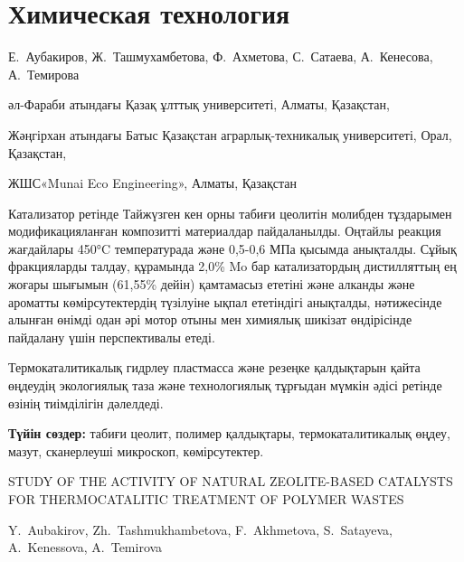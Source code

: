 \let\cleardoublepage\clearpage
\chapter{Химическая технология}

\begin{header}

Е.~Аубакиров,
Ж.~Ташмухамбетова,
Ф.~Ахметова\envelope,
С.~Сатаева,
А.~Кенесова,
А.~Темирова
\end{header}

\begin{affil}
әл-Фараби атындағы Қазақ ұлттық университеті, Алматы, Қазақстан,

Жәңгірхан атындағы Батыс Қазақстан аграрлық-техникалық университеті, Орал, Қазақстан,

 ЖШС«Munai Eco Engineering», Алматы, Қазақстан

\end{affil}

Катализатор ретінде Тайжүзген кен орны табиғи цеолитін молибден
тұздарымен модификацияланған композитті материалдар пайдаланылды.
Оңтайлы реакция жағдайлары 450°C температурада және 0,5-0,6 МПа қысымда
анықталды. Сұйық фракцияларды талдау, құрамында 2,0\% Mo бар
катализатордың дистилляттың ең жоғары шығымын (61,55\% дейін) қамтамасыз
ететіні және алканды және ароматты көмірсутектердің түзілуіне ықпал
ететіндігі анықталды, нәтижесінде алынған өнімді одан әрі мотор отыны
мен химиялық шикізат өндірісінде пайдалану үшін перспективалы етеді.

Термокаталитикалық гидрлеу пластмасса және резеңке қалдықтарын қайта
өңдеудің экологиялық таза және технологиялық тұрғыдан мүмкін әдісі
ретінде өзінің тиімділігін дәлелдеді.

{\bfseries Түйін сөздер:} табиғи цеолит, полимер қалдықтары,
термокаталитикалық өңдеу, мазут, сканерлеуші микроскоп, көмірсутектер.

\begin{header}
STUDY OF THE ACTIVITY OF NATURAL ZEOLITE-BASED CATALYSTS FOR THERMOCATALITIC TREATMENT OF POLYMER WASTES

Y.~Aubakirov,
Zh.~Tashmukhambetova,
F.~Akhmetova\envelope,
S.~Satayeva,
A.~Kenessova,
A.~Temirova
\end{header}


